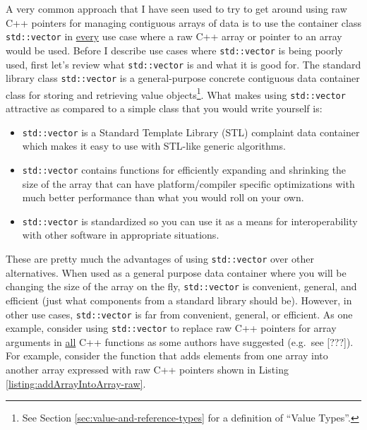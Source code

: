 \documentclass[pdf,ps2pdf,11pt]{SANDreport}
\begin{document}
A very common approach that I have seen used to try to get around
using raw C++ pointers for managing contiguous arrays of data is to
use the container class {}\texttt{std::vector} in {}\underline{every}
use case where a raw C++ array or pointer to an array would be used.
Before I describe use cases where {}\texttt{std::vector} is being
poorly used, first let's review what {}\texttt{std::vector} is and
what it is good for.  The standard library class
{}\texttt{std::vector} is a general-purpose concrete contiguous data
container class for storing and retrieving value objects\footnote{See
Section {}\ref{sec:value-and-reference-types} for a definition of
``Value Types''.}.  What makes using {}\texttt{std::vector} attractive
as compared to a simple class that you would write yourself is:

\begin{itemize}

{}\item\texttt{std::vector} is a Standard Template Library (STL)
complaint data container which makes it easy to use with STL-like
generic algorithms.

{}\item\texttt{std::vector} contains functions for efficiently
expanding and shrinking the size of the array that can have
platform/compiler specific optimizations with much better performance
than what you would roll on your own.

{}\item\texttt{std::vector} is standardized so you can use it as a
means for interoperability with other software in appropriate
situations.

\end{itemize}

These are pretty much the advantages of using {}\texttt{std::vector}
over other alternatives.  When used as a general purpose data
container where you will be changing the size of the array on the fly,
{}\texttt{std::vector} is convenient, general, and efficient (just
what components from a standard library should be).  However, in other
use cases, {}\texttt{std::vector} is far from convenient, general, or
efficient.  As one example, consider using {}\texttt{std::vector} to
replace raw C++ pointers for array arguments in {}\underline{all} C++
functions as some authors have suggested (e.g.\ see [???]).  For
example, consider the function that adds elements from one array into
another array expressed with raw C++ pointers shown in Listing
{}\ref{listing:addArrayIntoArray-raw}.
\end{document}
